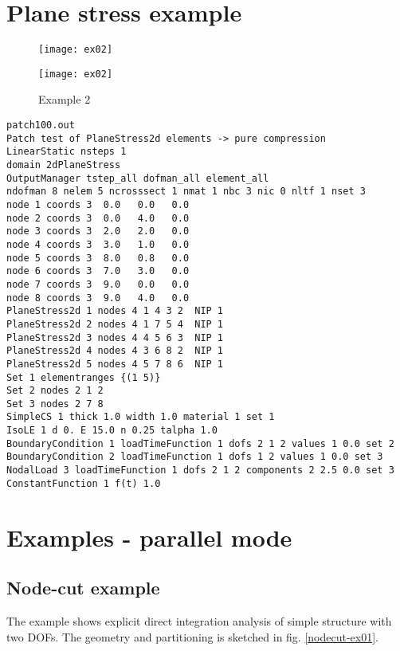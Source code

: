 \documentclass[a4paper]{report}
\begin{document}
\section {Plane stress example}
\begin{figure}[htb]
\begin{htmlonly}
  \centerline{\texttt{[image: ex02]}}
\end{htmlonly}
\centerline{\texttt{[image: ex02]}}
\caption{Example 2}
\label{ex02}
\end{figure}
{\small\begin{verbatim}
patch100.out
Patch test of PlaneStress2d elements -> pure compression
LinearStatic nsteps 1
domain 2dPlaneStress
OutputManager tstep_all dofman_all element_all
ndofman 8 nelem 5 ncrosssect 1 nmat 1 nbc 3 nic 0 nltf 1 nset 3
node 1 coords 3  0.0   0.0   0.0
node 2 coords 3  0.0   4.0   0.0
node 3 coords 3  2.0   2.0   0.0
node 4 coords 3  3.0   1.0   0.0
node 5 coords 3  8.0   0.8   0.0
node 6 coords 3  7.0   3.0   0.0
node 7 coords 3  9.0   0.0   0.0
node 8 coords 3  9.0   4.0   0.0
PlaneStress2d 1 nodes 4 1 4 3 2  NIP 1
PlaneStress2d 2 nodes 4 1 7 5 4  NIP 1
PlaneStress2d 3 nodes 4 4 5 6 3  NIP 1
PlaneStress2d 4 nodes 4 3 6 8 2  NIP 1
PlaneStress2d 5 nodes 4 5 7 8 6  NIP 1
Set 1 elementranges {(1 5)}
Set 2 nodes 2 1 2
Set 3 nodes 2 7 8
SimpleCS 1 thick 1.0 width 1.0 material 1 set 1
IsoLE 1 d 0. E 15.0 n 0.25 talpha 1.0
BoundaryCondition 1 loadTimeFunction 1 dofs 2 1 2 values 1 0.0 set 2
BoundaryCondition 2 loadTimeFunction 1 dofs 1 2 values 1 0.0 set 3
NodalLoad 3 loadTimeFunction 1 dofs 2 1 2 components 2 2.5 0.0 set 3
ConstantFunction 1 f(t) 1.0
\end{verbatim}}


\section{Examples - parallel mode}
\subsection{Node-cut example}
The example shows explicit direct integration analysis of
simple structure with two DOFs.
The geometry and partitioning is sketched in
fig. \ref{nodecut-ex01}.
\end{document}
